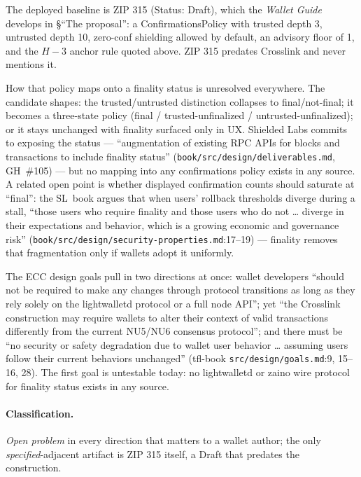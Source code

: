 \documentclass[11pt,a4paper]{article}
\theoremstyle{definition}
\begin{document}
The deployed baseline is ZIP 315 (Status: Draft), which the \emph{Wallet
Guide} develops in \S``The proposal'': a \textsf{ConfirmationsPolicy} with
trusted depth 3, untrusted depth 10, zero-conf shielding allowed by
default, an advisory floor of 1, and the $H-3$ anchor rule quoted above.
ZIP 315 predates Crosslink and never mentions it.

How that policy maps onto a finality status is unresolved everywhere. The
candidate shapes: the trusted/untrusted distinction collapses to
final/not-final; it becomes a three-state policy (final /
trusted-unfinalized / untrusted-unfinalized); or it stays unchanged with
finality surfaced only in UX. Shielded Labs commits to exposing the
status --- ``augmentation of existing RPC APIs for blocks and transactions
to include finality status'' (\texttt{book/src/design/deliverables.md},
GH~\#105) --- but no mapping into any confirmations policy exists in any
source. A related open point is whether displayed confirmation counts
should saturate at ``final'': the SL~book argues that when users' rollback
thresholds diverge during a stall, ``those users who require finality and
those users who do not \ldots{} diverge in their expectations and
behavior, which is a growing economic and governance risk''
(\texttt{book/src/design/security-properties.md}:17--19) --- finality
removes that fragmentation only if wallets adopt it uniformly.

The ECC design goals pull in two directions at once: wallet developers
``should not be required to make any changes through protocol transitions
as long as they rely solely on the lightwalletd protocol or a full node
API''; yet ``the Crosslink construction may require wallets to alter their
context of valid transactions differently from the current NU5/NU6
consensus protocol''; and there must be ``no security or safety
degradation due to wallet user behavior \ldots{} assuming users follow
their current behaviors unchanged'' (tfl-book
\texttt{src/design/goals.md}:9, 15--16, 28). The first goal is untestable
today: no lightwalletd or zaino wire protocol for finality status exists
in any source.

\paragraph{Classification.} \emph{Open problem} in every direction that
matters to a wallet author; the only \emph{specified}-adjacent artifact is
ZIP 315 itself, a Draft that predates the construction.
\end{document}
